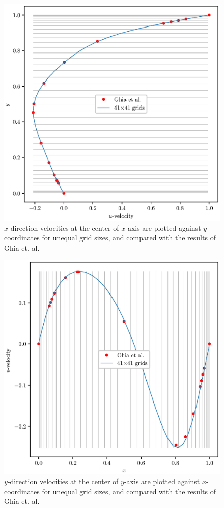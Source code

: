 \documentclass[12pt,a4paper,fleqn]{article}
\begin{document}
\begin{figure}[H]
    \centering
    \includegraphics[width=\linewidth]{2Dunequal_cavityFlowU.eps}
    \caption{\(x\)-direction velocities at the center of \(x\)-axis are plotted against \(y\)-coordinates for unequal grid sizes, and compared with the results of Ghia et. al.}
\end{figure}

\begin{figure}[H]
    \centering
    \includegraphics[width=\linewidth]{2Dunequal_cavityFlowV.eps}
    \caption{\(y\)-direction velocities at the center of \(y\)-axis are plotted against \(x\)-coordinates for unequal grid sizes, and compared with the results of Ghia et. al.}
\end{figure}
\end{document}
